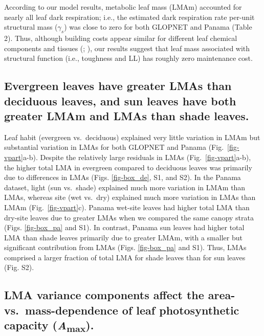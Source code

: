 \documentclass[
  12pt,
  letterpaper,
  DIV=11,
  numbers=noendperiod]{scrartcl}
\begin{document}
According to our model results, metabolic leaf mass (LMAm) accounted for
nearly all leaf dark respiration; i.e., the estimated dark respiration
rate per-unit structural mass (\(\gamma_s\)) was close to zero for both
GLOPNET and Panama (Table 2). Thus, although building costs appear
similar for different leaf chemical components and tissues
(;
), our results suggest
that leaf mass associated with structural function (i.e., toughness and
LL) has roughly zero maintenance cost.

\subsection{Evergreen leaves have greater LMAs than deciduous leaves,
and sun leaves have both greater LMAm and LMAs than shade
leaves.}\label{evergreen-leaves-have-greater-lmas-than-deciduous-leaves-and-sun-leaves-have-both-greater-lmam-and-lmas-than-shade-leaves.}

Leaf habit (evergreen vs.~deciduous) explained very little variation in
LMAm but substantial variation in LMAs for both GLOPNET and Panama
(Fig.~\ref{fig-vpart}a-b). Despite the relatively large residuals in
LMAs (Fig.~\ref{fig-vpart}a-b), the higher total LMA in evergreen
compared to deciduous leaves was primarily due to differences in LMAs
(Figs. \ref{fig-box_de}, S1, and S2). In the Panama dataset, light (sun
vs.~shade) explained much more variation in LMAm than LMAs, whereas site
(wet vs.~dry) explained much more variation in LMAs than LMAm
(Fig.~\ref{fig-vpart}c). Panama wet-site leaves had higher total LMA
than dry-site leaves due to greater LMAs when we compared the same
canopy strata (Figs. \ref{fig-box_pa} and S1). In contrast, Panama sun
leaves had higher total LMA than shade leaves primarily due to greater
LMAm, with a smaller but significant contribution from LMAs (Figs.
\ref{fig-box_pa} and S1). Thus, LMAs comprised a larger fraction of
total LMA for shade leaves than for sun leaves (Fig. S2).

\subsection{\texorpdfstring{LMA variance components affect the area-
vs.~mass-dependence of leaf photosynthetic capacity
(\emph{A}\textsubscript{max}).}{LMA variance components affect the area- vs.~mass-dependence of leaf photosynthetic capacity (Amax).}}\label{lma-variance-components-affect-the-area--vs.-mass-dependence-of-leaf-photosynthetic-capacity-amax.}
\end{document}

